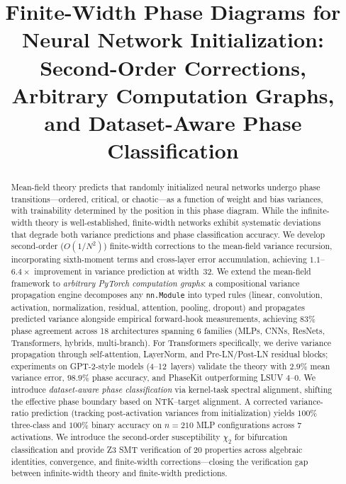 \documentclass[10pt]{article}
\title{Finite-Width Phase Diagrams for Neural Network Initialization:\\Second-Order Corrections, Arbitrary Computation Graphs,\\and Dataset-Aware Phase Classification}
\date{}
\begin{document}
\maketitle

\begin{abstract}
Mean-field theory predicts that randomly initialized neural networks undergo phase transitions---ordered, critical, or chaotic---as a function of weight and bias variances, with trainability determined by the position in this phase diagram.
While the infinite-width theory is well-established, finite-width networks exhibit systematic deviations that degrade both variance predictions and phase classification accuracy.
We develop second-order ($O(1/N^2)$) finite-width corrections to the mean-field variance recursion, incorporating sixth-moment terms and cross-layer error accumulation, achieving $1.1$--$6.4\times$ improvement in variance prediction at width~32.
We extend the mean-field framework to \emph{arbitrary PyTorch computation graphs}: a compositional variance propagation engine decomposes any \texttt{nn.Module} into typed rules (linear, convolution, activation, normalization, residual, attention, pooling, dropout) and propagates predicted variance alongside empirical forward-hook measurements, achieving 83\% phase agreement across 18 architectures spanning 6 families (MLPs, CNNs, ResNets, Transformers, hybrids, multi-branch).
For Transformers specifically, we derive variance propagation through self-attention, LayerNorm, and Pre-LN/Post-LN residual blocks; experiments on GPT-2-style models (4--12~layers) validate the theory with $2.9\%$ mean variance error, $98.9\%$ phase accuracy, and PhaseKit outperforming LSUV $4$--$0$.
We introduce \emph{dataset-aware phase classification} via kernel-task spectral alignment, shifting the effective phase boundary based on NTK--target alignment.
A corrected variance-ratio prediction (tracking post-activation variances from initialization) yields $100\%$ three-class and $100\%$ binary accuracy on $n=210$ MLP configurations across 7 activations.
We introduce the second-order susceptibility $\chi_2$ for bifurcation classification and provide Z3 SMT verification of 20 properties across algebraic identities, convergence, and finite-width corrections---closing the verification gap between infinite-width theory and finite-width predictions.
\end{abstract}
\end{document}
